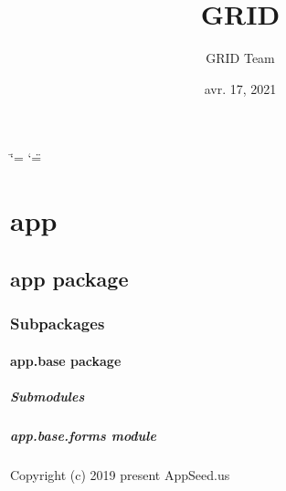 \documentclass[letterpaper,10pt,french]{sphinxmanual}
\title{GRID}
\date{avr. 17, 2021}
\author{GRID Team}
\begin{document}
\ifdefined\shorthandoff
  \ifnum\catcode`\=\string=\active\shorthandoff{=}\fi
  \ifnum\catcode`\"=\active{}\fi
\fi

\pagestyle{empty}
\sphinxmaketitle
\pagestyle{plain}
\sphinxtableofcontents
\pagestyle{normal}
\label{\detokenize{index::doc}}



\chapter{app}
\label{\detokenize{modules:app}}\label{\detokenize{modules::doc}}

\section{app package}
\label{\detokenize{app:app-package}}\label{\detokenize{app::doc}}

\subsection{Subpackages}
\label{\detokenize{app:subpackages}}

\subsubsection{app.base package}
\label{\detokenize{app.base:app-base-package}}\label{\detokenize{app.base::doc}}

\paragraph{Submodules}
\label{\detokenize{app.base:submodules}}

\paragraph{app.base.forms module}
\label{\detokenize{app.base:module-app.base.forms}}\label{\detokenize{app.base:app-base-forms-module}}
\sphinxAtStartPar
Copyright (c) 2019 \sphinxhyphen{} present AppSeed.us
\end{document}

